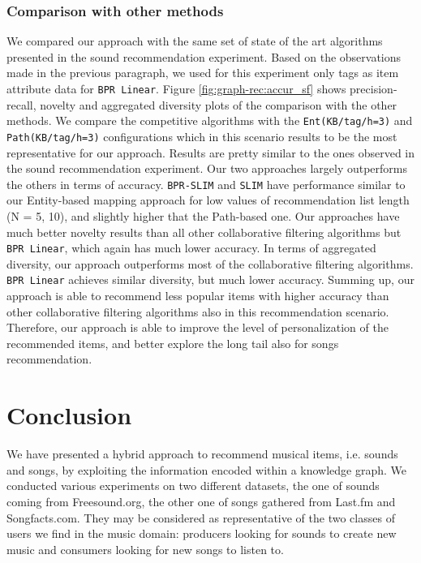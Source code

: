 \subsubsection{Comparison with other methods}\label{comp}
We compared our approach with the same set of state of the art algorithms presented in the sound recommendation experiment. Based on the observations made in the previous paragraph, we used for this experiment only tags as item attribute data for \texttt{BPR Linear}.
Figure \ref{fig:graph-rec:accur_sf} shows precision-recall, novelty and aggregated diversity plots of the comparison with the other methods. We compare the competitive algorithms with the \texttt{Ent(KB/tag/h=3)} and \texttt{Path(KB/tag/h=3)} configurations which in this scenario results to be the most representative for our approach. 
Results are pretty similar to the ones observed in the sound recommendation experiment. Our two approaches largely outperforms the others in terms of accuracy. \texttt{BPR-SLIM} and \texttt{SLIM} have performance similar to our Entity-based mapping approach for low values of recommendation list length (N = 5, 10), and slightly higher that the Path-based one. %
Our approaches have much better novelty results than all other collaborative filtering algorithms but \texttt{BPR Linear}, which again has much lower accuracy. In terms of aggregated diversity, our approach outperforms most of the collaborative filtering algorithms. \texttt{BPR Linear} achieves similar diversity, but much lower accuracy.
Summing up, our approach is able to recommend less popular items with higher accuracy than other collaborative filtering algorithms also in this recommendation scenario. Therefore, our approach is able to improve the level of personalization of the recommended items, and  better explore the long tail also for songs recommendation.



\section{Conclusion}
\label{sec:graph-rec:conclusion}
We have presented a hybrid approach to recommend musical items, i.e. sounds and songs, by exploiting the information encoded within a knowledge graph. We conducted various experiments on two different datasets, the one of sounds coming from Freesound.org, the other one of songs gathered from Last.fm and Songfacts.com. They may be considered as representative of the two classes of users we find in the music domain: producers looking for sounds to create new music and consumers looking for new songs to listen to.

